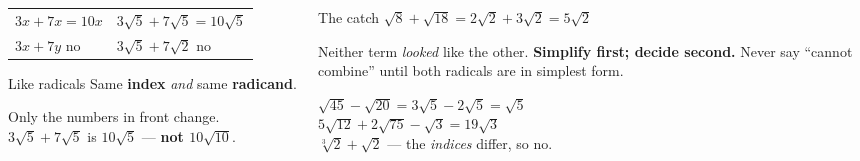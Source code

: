 \documentclass[aspectratio=169, 11pt]{beamer}
\begin{document}
\begin{frame}[t, plain]
  \begin{columns}[T]
    \begin{column}{0.48\textwidth}
      \footnotesize
      \begin{tabular}{ll}
      \hline
      $3x+7x=10x$ & $3\sqrt5+7\sqrt5=10\sqrt5$ \\
      $3x+7y$ \; no & $3\sqrt5+7\sqrt2$ \; no \\
      \hline
      \end{tabular}
      \vspace{8pt}

      \begin{block}{Like radicals}
        Same \textbf{index} \emph{and} same \textbf{radicand}.
      \end{block}
      \vspace{4pt}
      {\footnotesize Only the numbers in front change. $3\sqrt5+7\sqrt5$ is $10\sqrt5$ ---
      \textcolor{keyred}{\textbf{not $10\sqrt{10}$}}.}
    \end{column}
    \begin{column}{0.48\textwidth}
      \begin{block}{The catch}
        \centering $\sqrt{8}+\sqrt{18} = 2\sqrt2+3\sqrt2 = 5\sqrt2$
      \end{block}
      \vspace{4pt}
      {\footnotesize Neither term \emph{looked} like the other.
      \textcolor{goldacc}{\textbf{Simplify first; decide second.}} Never say ``cannot combine''
      until both radicals are in simplest form.}
      \vspace{5pt}

      \footnotesize
      $\sqrt{45}-\sqrt{20}=3\sqrt5-2\sqrt5=\sqrt5$ \\[3pt]
      $5\sqrt{12}+2\sqrt{75}-\sqrt3=19\sqrt3$ \\[3pt]
      $\sqrt[3]{2}+\sqrt{2}$ --- the \emph{indices} differ, so no.
    \end{column}
  \end{columns}
\end{frame}
\end{document}
